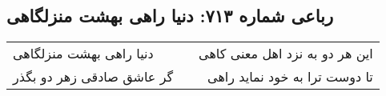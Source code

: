 \begin{center}
\section*{رباعی شماره ۷۱۳: دنیا راهی بهشت منزلگاهی}
\label{sec:sh713}
\begin{longtable}{l p{0.5cm} r}
دنیا راهی بهشت منزلگاهی
&&
این هر دو به نزد اهل معنی کاهی
\\
گر عاشق صادقی زهر دو بگذر
&&
تا دوست ترا به خود نماید راهی
\\
\end{longtable}
\end{center}

